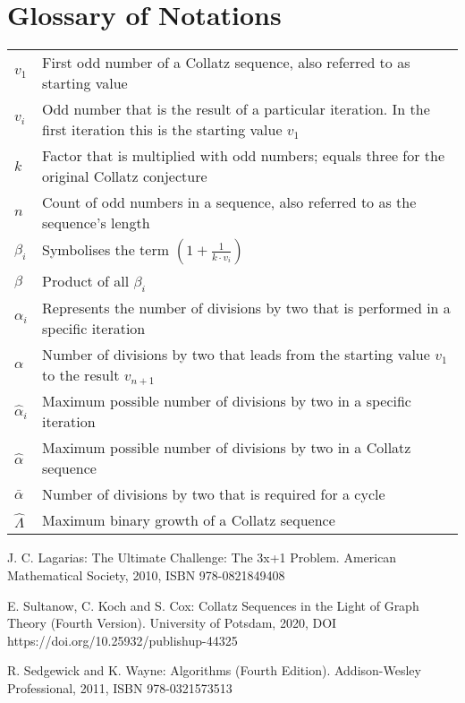\documentclass{SciPress_2015}
\begin{document}
\section{Glossary of Notations}
\label{appx:glossary_of_notations}
\vspace{-1em}
\begin{table}[H]
	\centering
	\setlength{\tabcolsep}{1,2em}\setlength\extrarowheight{3pt}
	\begin{tabular}{|l|p{13.5cm}|}
		\hline
		\thead{\textbf{Notation}} &
		\thead{\textbf{Description}}\\
		\hline
		$v_1$ &
		First odd number of a Collatz sequence, also referred to as starting value\\
		\hline
		$v_i$ &
		Odd number that is the result of a particular iteration. In the first iteration this is the starting value $v_1$\\
		\hline
		$k$ &
		Factor that is multiplied with odd numbers; equals three for the original Collatz conjecture\\
		\hline
		$n$ &
		Count of odd numbers in a sequence, also referred to as the sequence's length\\
		\hline
		$\beta_i$ &
		Symbolises the term $\left(1+\frac{1}{k\cdot v_i}\right)$\\
		\hline
		$\beta$ &
		Product of all $β_i$\\
		\hline
		$\alpha_i$ &
		Represents the number of divisions by two that is performed in a specific iteration\\
		\hline
		$\alpha$ &
		Number of divisions by two that leads from the starting value $v_1$  to the result $v_{n+1}$\\
		\hline
		$\hat\alpha_i$ &
		Maximum possible number of divisions by two in a specific iteration\\
		\hline
		$\hat\alpha$ &
		Maximum possible number of divisions by two in a Collatz sequence\\
		\hline
		$\bar\alpha$ &
		Number of divisions by two that is required for a cycle\\
		\hline
		$\hat\Lambda$ &
		Maximum binary growth of a Collatz sequence\\
		\hline
	\end{tabular}
\end{table}


\vspace{1em}
\begin{thebibliography}{99}

J. C. Lagarias: The Ultimate Challenge: The 3x+1 Problem. American Mathematical Society, 2010, ISBN 978-0821849408

E. Sultanow, C. Koch and S. Cox: Collatz Sequences in the Light of Graph Theory (Fourth Version). University of Potsdam, 2020, DOI https://doi.org/10.25932/publishup-44325

R. Sedgewick and K. Wayne: Algorithms (Fourth Edition). Addison-Wesley Professional, 2011, ISBN 978-0321573513

\end{thebibliography}
\end{document}
